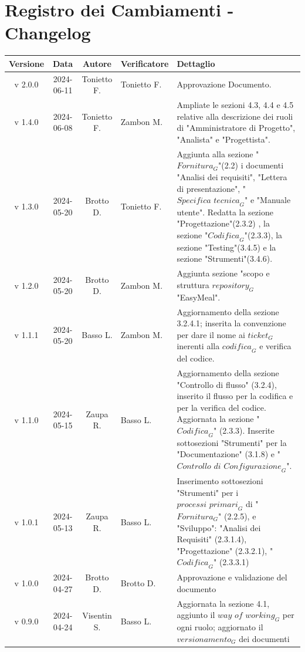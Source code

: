 \documentclass[12pt, oneside]{article}
\begin{document}
\section*{Registro dei Cambiamenti - Changelog}
\begin{longtable}{|c|c|c|p{3cm}|p{7cm}|}
\hline
\textbf{Versione} & \textbf{Data} & \textbf{Autore} & \textbf{Verificatore} & \textbf{Dettaglio} \\
\hline
v 2.0.0 & 2024-06-11 & Tonietto F. & Tonietto F. & Approvazione Documento. \\ 
\hline
v 1.4.0 & 2024-06-08 & Tonietto F. & Zambon M. & Ampliate le sezioni 4.3, 4.4 e 4.5 relative alla descrizione dei ruoli di "Amministratore di Progetto", "Analista" e "Progettista". 
\\
\hline
v 1.3.0 & 2024-05-20 & Brotto D. & Tonietto F. & Aggiunta alla sezione "$\textit{Fornitura}_G$"(2.2) i documenti "Analisi dei requisiti", "Lettera di presentazione", "$\textit{Specifica tecnica}_G$" e "Manuale utente".
\newline Redatta la sezione "Progettazione"(2.3.2) , la sezione "$\textit{Codifica}_G$"(2.3.3), la sezione "Testing"(3.4.5) e la sezione "Strumenti"(3.4.6).
\\
\hline
v 1.2.0 & 2024-05-20 & Brotto D. & Zambon M. & Aggiunta sezione "scopo e struttura $\textit{repository}_G$ "EasyMeal". \\
\hline
v 1.1.1 & 2024-05-20 & Basso L. & Zambon M. & Aggiornamento della sezione 3.2.4.1; inserita la convenzione per dare il nome ai $\textit{ticket}_G$ inerenti alla $\textit{codifica}_G$ e verifica del codice. \\
\hline
v 1.1.0 & 2024-05-15 & Zaupa R. & Basso L. & Aggiornamento della sezione "Controllo di flusso" (3.2.4), inserito il flusso per la codifica e per la verifica del codice. Aggiornata la sezione "$\textit{Codifica}_G$" (2.3.3). Inserite sottosezioni "Strumenti" per la "Documentazione" (3.1.8) e "$\textit{Controllo di Configurazione}_G$".\\
\hline
v 1.0.1 & 2024-05-13 & Zaupa R. & Basso L. & Inserimento sottosezioni "Strumenti" per i $\textit{processi primari}_G$ di "$\textit{Fornitura}_G$" (2.2.5), e "Sviluppo": "Analisi dei Requisiti" (2.3.1.4), "Progettazione" (2.3.2.1), "$\textit{Codifica}_G$" (2.3.3.1) \\
\hline
v 1.0.0 & 2024-04-27 & Brotto D. & Brotto D. & Approvazione e validazione del documento \\
\hline
v 0.9.0 & 2024-04-24 & Visentin S. & Basso L. & Aggiornata la sezione 4.1, aggiunto il $\textit{way of working}_G$ per ogni ruolo; aggiornato il $\textit{versionamento}_G$ dei documenti \\

\end{longtable}
\end{document}

